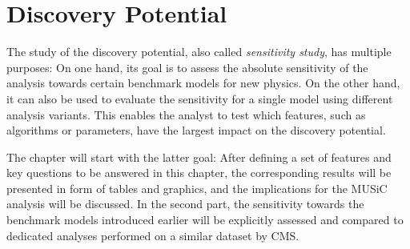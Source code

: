 
\newcommand{\lumiA}{\SI{2.3}{\per\femto\barn}\xspace}
\newcommand{\lumiB}{\SI{35.9}{\per\femto\barn}\xspace}

\chapter{Discovery Potential}
\label{chap:sensitivity_studies}

The study of the discovery potential, also called \emph{sensitivity study}, has multiple purposes: On one hand, its goal is to assess the absolute sensitivity of the analysis towards certain benchmark models for new physics. On the other hand, it can also be used to evaluate the sensitivity for a single model using different analysis variants. This enables the analyst to test which features, such as algorithms or parameters, have the largest impact on the discovery potential.

The chapter will start with the latter goal: After defining a set of features and key questions to be answered in this chapter, the corresponding results will be presented in form of tables and graphics, and the implications for the \ac{MUSiC} analysis will be discussed. 
In the second part, the sensitivity towards the benchmark models introduced earlier will be explicitly assessed and compared to dedicated analyses performed on a similar dataset by \ac{CMS}.

